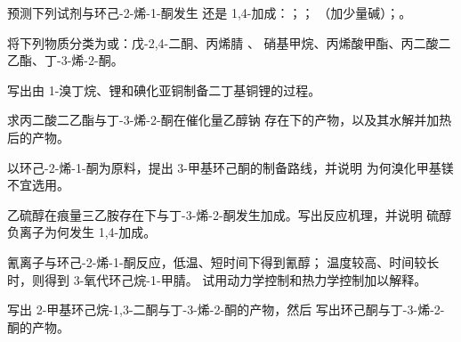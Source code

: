 \begin{exercise}[$\star$]\label{exo:b2:conjugate-additions:1}
预测下列试剂与环己-2-烯-1-酮发生 还是 1,4-加成：；；
（加少量碱）；。
\end{exercise}

\begin{exercise}[$\star$]\label{exo:b2:conjugate-additions:2}
将下列物质分类为或：戊-2,4-二酮、丙烯腈 、
硝基甲烷、丙烯酸甲酯、丙二酸二乙酯、丁-3-烯-2-酮。
\end{exercise}

\begin{exercise}[$\star$]\label{exo:b2:conjugate-additions:3}
写出由 1-溴丁烷、锂和碘化亚铜制备二丁基铜锂的过程。
\end{exercise}

\begin{exercise}[$\star$]\label{exo:b2:conjugate-additions:4}
求丙二酸二乙酯与丁-3-烯-2-酮在催化量乙醇钠
存在下的产物，以及其水解并加热后的产物。
\end{exercise}

\begin{exercise}[$\star\star$]\label{exo:b2:conjugate-additions:5}
以环己-2-烯-1-酮为原料，提出 3-甲基环己酮的制备路线，并说明
为何溴化甲基镁不宜选用。
\end{exercise}

\begin{exercise}[$\star\star$]\label{exo:b2:conjugate-additions:6}
乙硫醇在痕量三乙胺存在下与丁-3-烯-2-酮发生加成。写出反应机理，并说明
硫醇负离子为何发生 1,4-加成。
\end{exercise}

\begin{exercise}[$\star\star$]\label{exo:b2:conjugate-additions:7}
氰离子与环己-2-烯-1-酮反应，低温、短时间下得到氰醇；
温度较高、时间较长时，则得到 3-氧代环己烷-1-甲腈。
试用动力学控制和热力学控制加以解释。
\end{exercise}

\begin{exercise}[$\star\star$]\label{exo:b2:conjugate-additions:8}
写出 2-甲基环己烷-1,3-二酮与丁-3-烯-2-酮的产物，然后
写出环己酮与丁-3-烯-2-酮的产物。
\end{exercise}


